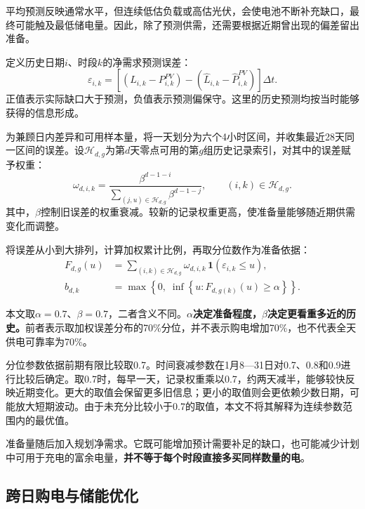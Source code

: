 平均预测反映通常水平，但连续低估负载或高估光伏，会使电池不断补充缺口，最终可能触及最低储电量。因此，除了预测供需，还需要根据近期曾出现的偏差留出准备。

定义历史日期$i$、时段$k$的净需求预测误差：
\begin{equation}
\varepsilon_{i,k}=\left[\left(L_{i,k}-P^{PV}_{i,k}\right)-\left(\widehat L_{i,k}-\widehat P^{PV}_{i,k}\right)\right]\Delta t.
\label{eq:q2_error}
\end{equation}
正值表示实际缺口大于预测，负值表示预测偏保守。这里的历史预测均按当时能够获得的信息形成。

为兼顾日内差异和可用样本量，将一天划分为六个4小时区间，并收集最近28天同一区间的误差。设$\mathcal H_{d,g}$为第$d$天零点可用的第$g$组历史记录索引，对其中的误差赋予权重：
\begin{equation}
\omega_{d,i,k}=\frac{\beta^{d-1-i}}{\displaystyle\sum_{(j,u)\in\mathcal H_{d,g}}\beta^{d-1-j}},
\qquad (i,k)\in\mathcal H_{d,g}.
\label{eq:q2_weight}
\end{equation}
其中，$\beta$控制旧误差的权重衰减。较新的记录权重更高，使准备量能够随近期供需变化而调整。

将误差从小到大排列，计算加权累计比例，再取分位数作为准备依据：
\begin{align}
F_{d,g}(u)&=\sum_{(i,k)\in\mathcal H_{d,g}}\omega_{d,i,k}\,\mathbf 1(\varepsilon_{i,k}\le u),\label{eq:q2_cdf}\\
b_{d,k}&=\max\left\{0,\;\inf\left\{u:F_{d,g(k)}(u)\ge\alpha\right\}\right\}.\label{eq:q2_reserve}
\end{align}

本文取$\alpha=0.7$、$\beta=0.7$，二者含义不同。\textbf{$\alpha$决定准备程度，$\beta$决定更看重多近的历史。}前者表示取加权误差分布的70\%分位，并不表示购电增加70\%，也不代表全天供电可靠率为70\%。

分位参数依据前期有限比较取0.7。时间衰减参数在1月8—31日对0.7、0.8和0.9进行比较后确定。取0.7时，每早一天，记录权重乘以0.7，约两天减半，能够较快反映近期变化。更大的取值会保留更多旧信息；更小的取值则会更依赖少数日期，可能放大短期波动。由于未充分比较小于0.7的取值，本文不将其解释为连续参数范围内的最优值。

准备量随后加入规划净需求。它既可能增加预计需要补足的缺口，也可能减少计划中可用于充电的富余电量，\textbf{并不等于每个时段直接多买同样数量的电}。

\subsection{跨日购电与储能优化}

